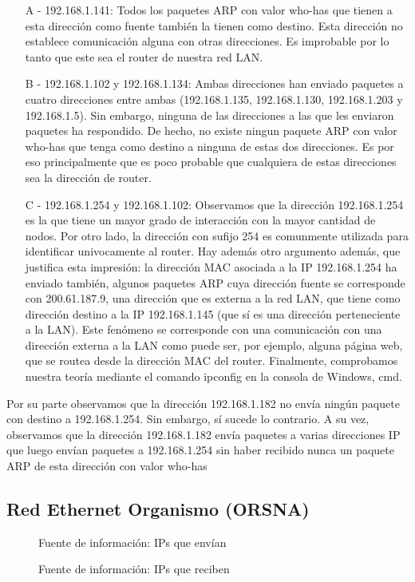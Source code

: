 \documentclass[a4paper, 11pt]{article}
\newcommand{\ponerGrafico}[4]
{\begin{figure}[H]
  \centering
  \subfloat{\hspace{-3.5cm}\texttt{[image: \#1]}}
  \caption{#2} \label{fig:#4}
\end{figure}
}
\begin{document}
\begin{enumerate}
\item[A] - 192.168.1.141: Todos los paquetes ARP con valor who-has que tienen a esta dirección como fuente también la tienen como destino. Esta dirección no establece comunicación alguna con otras direcciones. Es improbable por lo tanto que este sea el router de nuestra red LAN.

\item[B] - 192.168.1.102 y 192.168.1.134: Ambas direcciones han enviado paquetes a cuatro direcciones entre ambas (192.168.1.135, 192.168.1.130, 192.168.1.203 y 192.168.1.5). Sin embargo, ninguna de las direcciones a las que les enviaron paquetes ha respondido. De hecho, no existe ningun paquete ARP con valor who-has que tenga como destino a ninguna de estas dos direcciones. Es por eso principalmente que es poco probable que cualquiera de estas direcciones sea la dirección de router.

\item[C] - 192.168.1.254 y 192.168.1.102: Observamos que la dirección 192.168.1.254 es la que tiene un mayor grado de interacción con la mayor cantidad de nodos. Por otro lado, la dirección con sufijo 254 es comunmente utilizada para identificar univocamente al router. Hay además otro argumento además, que justifica esta impresión: la dirección MAC asociada a la IP 192.168.1.254 ha enviado también, algunos paquetes ARP cuya dirección fuente se corresponde con 200.61.187.9, una dirección que es externa a la red LAN, que tiene como dirección destino a la IP 192.168.1.145 (que sí es una dirección perteneciente a la LAN). Este fenómeno se corresponde con una comunicación con una dirección externa a la LAN como puede ser, por ejemplo, alguna página web, que se routea desde la dirección MAC del router. Finalmente, comprobamos nuestra teoría mediante el comando ipconfig en la consola de Windows, cmd.

\end{enumerate}

Por su parte observamos que la dirección 192.168.1.182 no envía ningún paquete con destino a 192.168.1.254. Sin embargo, sí sucede lo contrario. A su vez, observamos que la dirección 192.168.1.182 envía paquetes a varias direcciones IP que luego envían paquetes a 192.168.1.254 sin haber recibido nunca un paquete ARP de esta dirección con valor who-has


    
\subsection{Red Ethernet Organismo (ORSNA)}
\ponerGrafico{graficos/orsna_entropia.png}{Fuente de informaci\'on: IPs que env\'ian}{0.5}{label}
\ponerGrafico{graficos/orsna_entropia_rcv.png}{Fuente de informaci\'on: IPs que reciben}{0.5}{orsna_entr_rcv}
\end{document}
